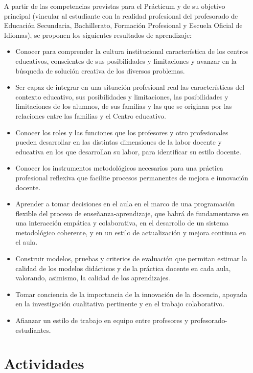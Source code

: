 \documentclass[12pt,a4paper]{article}
\begin{document}
A partir de las competencias previstas para el Prácticum y de su objetivo principal (vincular al estudiante con la realidad profesional del profesorado de Educación Secundaria, Bachillerato, Formación Profesional y Escuela Oficial de Idiomas), se proponen los siguientes resultados de aprendizaje:

\begin{itemize}
  \item Conocer para comprender la cultura institucional característica de los centros educativos, conscientes de sus posibilidades y limitaciones y avanzar en la búsqueda de solución creativa de los diversos problemas.
  \item Ser capaz de integrar en una situación profesional real las características del contexto educativo, sus posibilidades y limitaciones, las posibilidades y limitaciones de los alumnos, de sus familias y las que se originan por las relaciones entre las familias y el Centro educativo.
  \item Conocer los roles y las funciones que los profesores y otro profesionales pueden desarrollar en las distintas dimensiones de la labor docente y educativa en los que desarrollan su labor, para identificar su estilo docente.
  \item Conocer los instrumentos metodológicos necesarios para una práctica profesional reflexiva que facilite procesos permanentes de mejora e innovación docente.
  \item Aprender a tomar decisiones en el aula en el marco de una programación flexible del proceso de enseñanza-aprendizaje, que habrá de fundamentarse en una interacción empática y colaborativa, en el desarrollo de un sistema metodológico coherente, y en un estilo de actualización y mejora continua en el aula.
  \item Construir modelos, pruebas y criterios de evaluación que permitan estimar la calidad de los modelos didácticos y de la práctica docente en cada aula, valorando, asimismo, la calidad de los aprendizajes.
  \item Tomar conciencia de la importancia de la innovación de la docencia, apoyada en la investigación cualitativa pertinente y en el trabajo colaborativo.
  \item Afianzar un estilo de trabajo en equipo entre profesores y profesorado-estudiantes.
\end{itemize}

\section{Actividades}\label{subsec:actividades}
\end{document}
